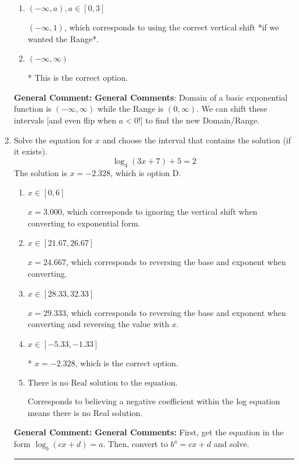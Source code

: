 \documentclass{extbook}[14pt]
\newcommand{\litem}[1]{\item #1

\rule{\textwidth}{0.4pt}}
\begin{document}
\begin{enumerate}
{\begin{enumerate}[label=\Alph*.]
$(-1, \infty)$, which corresponds to using the negative vertical shift AND flipping the Range interval.
\item \( (-\infty, a), a \in [0, 3] \)

$(-\infty, 1)$, which corresponds to using the correct vertical shift *if we wanted the Range*.
\item \( (-\infty, \infty) \)

* This is the correct option.
\end{enumerate}

\textbf{General Comment:} \textbf{General Comments}: Domain of a basic exponential function is $(-\infty, \infty)$ while the Range is $(0, \infty)$. We can shift these intervals [and even flip when $a<0$!] to find the new Domain/Range.
}
\litem{
Solve the equation for $x$ and choose the interval that contains the solution (if it exists).
\[ \log_{4}{(3x+7)}+5 = 2 \]The solution is \( x = -2.328 \), which is option D.\begin{enumerate}[label=\Alph*.]
\item \( x \in [0, 6] \)

$x = 3.000$, which corresponds to ignoring the vertical shift when converting to exponential form.
\item \( x \in [21.67, 26.67] \)

$x = 24.667$, which corresponds to reversing the base and exponent when converting.
\item \( x \in [28.33, 32.33] \)

$x = 29.333$, which corresponds to reversing the base and exponent when converting and reversing the value with $x$.
\item \( x \in [-5.33, -1.33] \)

* $x = -2.328$, which is the correct option.
\item \( \text{There is no Real solution to the equation.} \)

Corresponds to believing a negative coefficient within the log equation means there is no Real solution.
\end{enumerate}

\textbf{General Comment:} \textbf{General Comments:} First, get the equation in the form $\log_b{(cx+d)} = a$. Then, convert to $b^a = cx+d$ and solve.
}
\end{enumerate}
\end{document}
